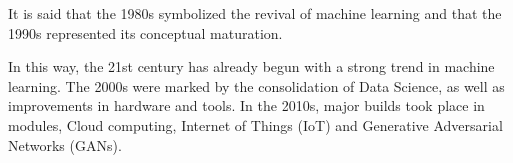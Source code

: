 \documentclass{article}
\begin{document}
\hfill

It is said that the 1980s symbolized the revival of machine learning and that the 1990s represented its conceptual maturation.

\hfill

In this way, the 21st century has already begun with a strong trend in machine learning. The 2000s were marked by the consolidation of Data Science, as well as improvements in hardware and tools. In the 2010s, major builds took place in modules, Cloud computing, Internet of Things (IoT) and Generative Adversarial Networks (GANs).
\end{document}

